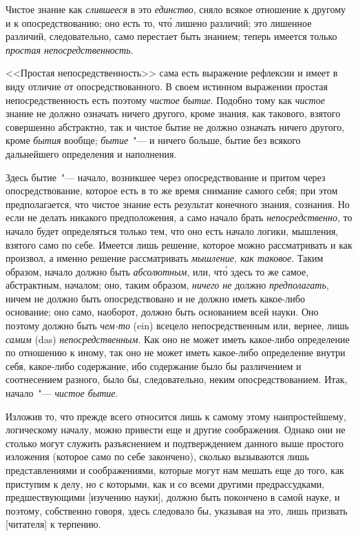 Чистое знание как \emph{слившееся} в это \emph{единство}, сняло
всякое отношение к другому и к опосредствованию; оно
есть то, чт\'о лишено различий; это лишенное различий,
следовательно, само перестает быть знанием; теперь
имеется только \emph{простая непосредственность}.

<<Простая непосредственность>> сама есть выражение
рефлексии и имеет в виду отличие от опосредствованного.
В своем истинном выражении простая непосредственность
есть поэтому \emph{чистое бытие}. Подобно тому как \emph{чистое}
знание не должно означать ничего другого, кроме
знания, как такового, взятого совершенно абстрактно, так
и чистое бытие не должно означать ничего другого, кроме
\emph{бытия} вообще; \emph{бытие}~"--- и ничего больше, бытие без
всякого дальнейшего определения и наполнения.

Здесь бытие~"--- начало, возникшее через опосредствование
и притом через опосредствование, которое есть
в то же время снимание самого себя; при этом предполагается,
что чистое знание есть результат конечного знания,
сознания. Но если не делать никакого предположения,
а само начало брать \emph{непосредственно}, то начало будет
определяться только тем, что оно есть начало логики,
мышления, взятого само по себе. Имеется лишь решение,
которое можно рассматривать и как произвол,
а именно решение рассматривать \emph{мышление, как таковое}.
Таким образом, начало должно быть \emph{абсолютным}, или, чт\'о
здесь то же самое, абстрактным, началом; оно, таким
образом, \emph{ничего не} должно \emph{предполагать}, ничем не должно
быть опосредствовано и не должно иметь какое-либо
основание; оно само, наоборот, должно быть основанием
всей науки. Оно поэтому должно быть \emph{чем-то} (ein) всецело
непосредственным или, вернее, лишь \emph{самим} (das)
\emph{непосредственным}. Как оно не может иметь какое-либо
определение по отношению к иному, так оно не может
иметь какое-либо определение внутри себя, какое-либо
содержание, ибо содержание было бы различением и соотнесением
разного, было бы, следовательно, неким опосредствованием.
Итак, начало~"--- \emph{чистое бытие}.

Изложив то, что прежде всего относится лишь к самому
этому наипростейшему, логическому началу, можно
привести еще и другие соображения. Однако они не
столько могут служить разъяснением и подтверждением
данного выше простого изложения (которое само по себе
закончено), сколько вызываются лишь представлениями
и соображениями, которые могут нам мешать еще до
того, как приступим к делу, но с которыми, как и со
всеми другими предрассудками, предшествующими [изучению
науки], должно быть покончено в самой науке, и
поэтому, собственно говоря, здесь следовало бы, указывая
на это, лишь призвать [читателя] к терпению.

